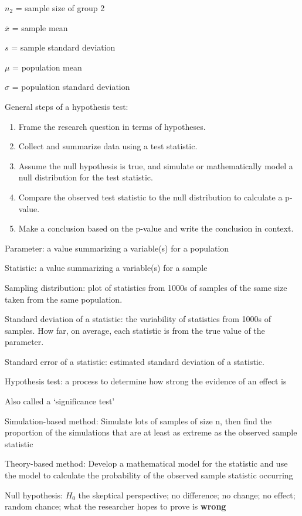 \documentclass[
]{report}
\newcommand{\rgi}{\hspace{24pt}}  %
\begin{document}
\(n_2\) = sample size of group 2

\(\overline{x}\) = sample mean

\(s\) = sample standard deviation

\(\mu\) = population mean

\(\sigma\) = population standard deviation

General steps of a hypothesis test:

\begin{enumerate}
\def\labelenumi{\arabic{enumi}.}
\item
  Frame the research question in terms of hypotheses.
\item
  Collect and summarize data using a test statistic.
\item
  Assume the null hypothesis is true, and simulate or mathematically model a null distribution for the test statistic.
\item
  Compare the observed test statistic to the null distribution to calculate a p-value.
\item
  Make a conclusion based on the p-value and write the conclusion in context.
\end{enumerate}

Parameter: a value summarizing a variable(s) for a population

Statistic: a value summarizing a variable(s) for a sample

Sampling distribution: plot of statistics from 1000s of samples of the same size taken from the same population.

Standard deviation of a statistic: the variability of statistics from 1000s of samples. How far, on average, each statistic is from the true value of the parameter.

Standard error of a statistic: estimated standard deviation of a statistic.

Hypothesis test: a process to determine how strong the evidence of an effect is

\rgi Also called a `significance test'

Simulation-based method: Simulate lots of samples of size n, then find the proportion of the simulations that are at least as extreme as the observed sample statistic

Theory-based method: Develop a mathematical model for the statistic and use the model to calculate the probability of the observed sample statistic occurring

Null hypothesis: \(H_0\) the skeptical perspective; no difference; no change; no effect; random chance; what the researcher hopes to prove is \textbf{wrong}
\end{document}
